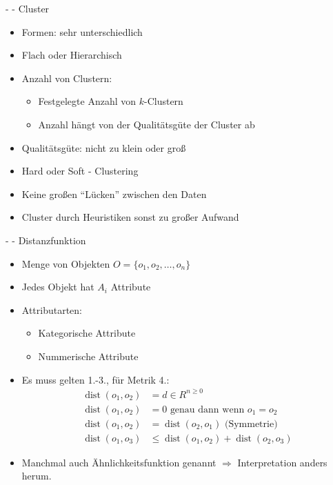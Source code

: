 \documentclass[fleqn,11pt,aspectratio=43]{beamer}
\DeclareMathOperator{\dist}{dist}
\begin{document}
\begin{frame}{\insertsectionhead - \insertsubsectionhead - Cluster \cite{dwh}}
\begin{itemize}
\item Formen: sehr unterschiedlich
\item Flach oder Hierarchisch
\item Anzahl von Clustern:
\begin{itemize}
\item Festgelegte Anzahl von $k$-Clustern
\item Anzahl hängt von der Qualitätsgüte der Cluster ab
\end{itemize} 
\item Qualitätsgüte: nicht zu klein oder groß
\item Hard oder Soft - Clustering
\item Keine großen \enquote{Lücken} zwischen den Daten
\item Cluster durch Heuristiken sonst zu großer Aufwand
\end{itemize}
\end{frame}

\begin{frame}{\insertsectionhead - \insertsubsectionhead - Distanzfunktion \cite{ester2000knowledge}}
\begin{itemize}
\item Menge von Objekten $O = \{o_1, o_2, \ldots, o_n\}$
\item Jedes Objekt hat $A_i$ Attribute
\item Attributarten:
\begin{itemize}
\item Kategorische Attribute
\item Nummerische Attribute
\end{itemize}
\item Es muss gelten 1.-3., für Metrik 4.:
\begin{align}
\dist(o_1, o_2) &= d \in R^{n\geq 0}\\
\dist(o_1, o_2) &= 0 \mbox{ genau dann wenn } o_1 = o_2\\
\dist(o_1, o_2) &= \dist(o_2, o_1) \mbox{ (Symmetrie)}\\
\dist(o_1, o_3) &\leq \dist(o_1, o_2) + \dist(o_2, o_3)
\end{align}
\item Manchmal auch Ähnlichkeitsfunktion genannt $\Rightarrow$ Interpretation anders herum.
\end{itemize}
\end{frame}
\end{document}
